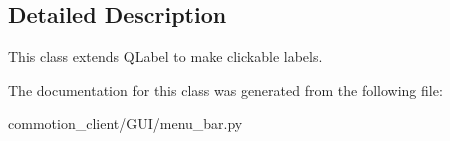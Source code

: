 \subsection{Detailed Description}
\begin{DoxyVerb}This class extends QLabel to make clickable labels.
\end{DoxyVerb}
 

The documentation for this class was generated from the following file\+:\begin{DoxyCompactItemize}
\item 
commotion\+\_\+client/\+G\+U\+I/menu\+\_\+bar.\+py\end{DoxyCompactItemize}
